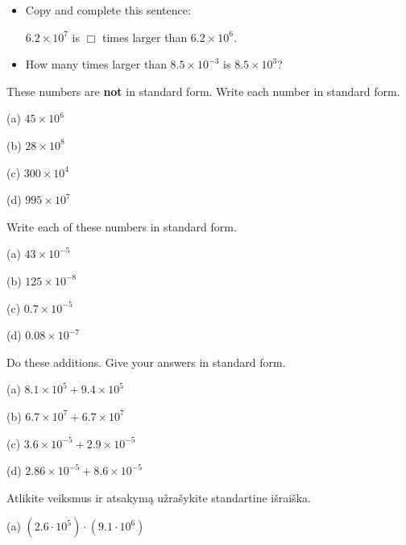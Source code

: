 \begin{multicols}{2}
\begin{uzd}

\phantom{a}

\begin{itemize}
\item[(a)] Copy and complete this sentence:  

$6.2 \times 10^7$ is $\Box$ times larger than $6.2 \times 10^6$.  

\item[(b)] How many times larger than $8.5 \times 10^{-3}$ is $8.5 \times 10^3$?
\end{itemize}
\end{uzd}


\begin{uzd}
These numbers are \textbf{not} in standard form. Write each number in standard form.
\resetcolumnrule
\begin{multicols}{2}
(a) $45 \times 10^6$  

(b) $28 \times 10^8$  

(c) $300 \times 10^4$  

(d) $995 \times 10^7$
\end{multicols}
\end{uzd}


\begin{uzd}
Write each of these numbers in standard form.
\resetcolumnrule
\begin{multicols}{2}
(a) $43 \times 10^{-5}$  

(b) $125 \times 10^{-8}$  

(c) $0.7 \times 10^{-5}$  

(d) $0.08 \times 10^{-7}$
\end{multicols}
\end{uzd}


\begin{uzd}
Do these additions. Give your answers in standard form.
\resetcolumnrule
\begin{multicols}{2}
(a) $8.1 \times 10^5 + 9.4 \times 10^5$  

(b) $6.7 \times 10^7 + 6.7 \times 10^7$  

(c) $3.6 \times 10^{-5} + 2.9 \times 10^{-5}$  

(d) $2.86 \times 10^{-5} + 8.6 \times 10^{-5}$
\end{multicols}
\end{uzd}
\begin{puzd}
Atlikite veiksmus ir atsakymą užrašykite standartine išraiška.
\resetcolumnrule
\begin{multicols}{2}
(a) $(2.6 \cdot 10^5) \cdot (9.1 \cdot 10^6)$  


\end{multicols}
\end{puzd}
\end{multicols}
